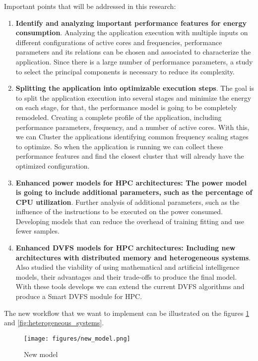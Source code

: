 Important points that will be addressed in this research:
\begin{enumerate}
    \item \textbf{Identify and analyzing important performance features for energy consumption}. Analyzing the application execution with multiple inputs on different configurations of active cores and frequencies, performance parameters and its relations can be chosen and associated to characterize the application. Since there is a large number of performance parameters, a study to select the principal components is necessary to reduce its complexity. 
    \item \textbf{Splitting the application into optimizable execution steps}. The goal is to split the application execution into several stages and minimize the energy on each stage, for that, the performance model is going to be completely remodeled. Creating a complete profile of the application, including performance parameters, frequency, and a number of active cores. With this, we can Cluster the applications identifying common frequency scaling stages to optimize. So when the application is running we can collect these performance features and find the closest cluster that will already have the optimized configuration.
    \item \textbf{Enhanced power models for HPC architectures: The power model is going to include additional parameters, such as the percentage of CPU utilization}. Further analysis of additional parameters, such as the influence of the instructions to be executed on the power consumed. Developing models that can reduce the overhead of training fitting and use fewer samples.
    \item \textbf{Enhanced DVFS models for HPC architectures: Including new architectures with distributed memory and heterogeneous systems}. Also studied the viability of using mathematical and artificial intelligence models, their advantages and their trade-offs to produce the final model. With these tools develops we can extend the current DVFS algorithms and produce a Smart DVFS module for HPC.
\end{enumerate}

The new workflow that we want to implement can be illustrated on the figures \ref{fig:new_model} and \ref{fig:heterogeneous_systems}.

\begin{figure}[h]
    \centering
    \texttt{[image: figures/new\_model.png]}
    \caption{New model}
    \label{fig:new_model}
\end{figure}


